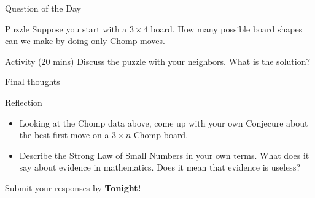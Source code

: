 \documentclass{beamer}
\begin{document}
\begin{frame}{Question of the Day}
\pause
  \begin{block}{Puzzle}
    Suppose you start with a $3\times 4$ board.
    How many possible board shapes can we make by doing only Chomp moves.
  \end{block}
\pause
  \begin{block}{Activity (20 mins)}
    Discuss the puzzle with your neighbors.  What is the solution?
  \end{block}
\end{frame}

\begin{frame}{Final thoughts}
  \begin{block}{Reflection}
    \begin{itemize}
\pause
      \item Looking at the Chomp data above, come up with your own Conjecure about the best first move on a $3\times n$ Chomp board.
\pause
      \item Describe the Strong Law of Small Numbers in your own terms.  What does it say about evidence in mathematics.  Does it mean that evidence is useless?
    \end{itemize}
  \end{block}
\begin{center}
Submit your responses by \textbf{Tonight!}
\end{center}
\end{frame}
\end{document}
